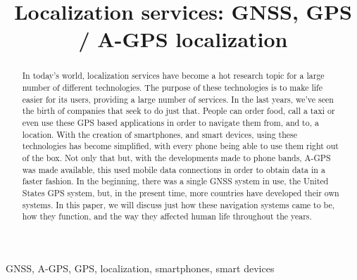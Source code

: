 \documentclass[conference]{IEEEtran}
\begin{document}
\title{Localization services: GNSS, GPS / A-GPS localization \\
}

\author{
\and
{}
}

\maketitle

\begin{abstract}

In today's world, localization services have become a hot research topic for a large number of different technologies. The purpose of these technologies is to make life easier for its users, providing a large number of services. In the last years, we've seen the birth of companies that seek to do just that. People can order food, call a taxi or even use these GPS based applications in order to navigate them from, and to, a location. With the creation of smartphones, and smart devices, using these technologies has become simplified, with every phone being able to use them right out of the box. Not only that but, with the developments made to phone bands, A-GPS was made available, this used mobile data connections in order to obtain data in a faster fashion. In the beginning, there was a single GNSS system in use, the United States GPS system, but, in the present time, more countries have developed their own systems. In this paper, we will discuss just how these navigation systems came to be, how they function, and the way they affected human life throughout the years. 

\end{abstract}

\begin{IEEEkeywords}
GNSS, A-GPS, GPS, localization, smartphones, smart devices
\end{IEEEkeywords}
\end{document}
